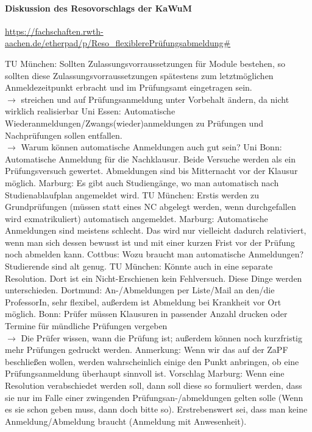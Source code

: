     \paragraph{Diskussion des Resovorschlags der KaWuM}
      \url{https://fachschaften.rwth-aachen.de/etherpad/p/Reso_flexiblerePrüfungsabmeldung#}
      \begin{outline}
        \1 TU München: \flqq Sollten Zulassungsvorraussetzungen für Module bestehen, so sollten diese Zulassungsvorraussetzungen spätestens zum letztmöglichen Anmeldezeitpunkt erbracht und im Prüfungsamt eingetragen sein.\frqq \\
          $\rightarrow$ streichen und auf Prüfungsanmeldung unter Vorbehalt ändern, da nicht wirklich realisierbar
        \1 Uni Essen: \flqq Automatische Wiederanmeldungen/Zwangs(wieder)anmeldungen zu Prüfungen und Nachprüfungen sollen entfallen.\frqq \\
          $\rightarrow$ Warum können automatische Anmeldungen auch gut sein?
          \2 Uni Bonn: Automatische Anmeldung für die Nachklausur. Beide Versuche werden als ein Prüfungsversuch gewertet. Abmeldungen sind bis Mitternacht vor der Klausur möglich.
          \2 Marburg: Es gibt auch Studiengänge, wo man automatisch nach Studienablaufplan angemeldet wird.
          \2 TU München: Erstis werden zu Grundprüfungen (müssen statt eines NC abgelegt werden, wenn durchgefallen wird exmatrikuliert) automatisch angemeldet.
          \2 Marburg: Automatische Anmeldungen sind meistens schlecht. Das wird nur vielleicht dadurch relativiert, wenn man sich dessen bewusst ist und mit einer kurzen Frist vor der Prüfung noch abmelden kann.
          \2 Cottbus: Wozu braucht man automatische Anmeldungen? Studierende sind alt genug.
          \2 TU München: Könnte auch in eine separate Resolution. Dort ist ein Nicht-Erschienen kein Fehlversuch. Diese Dinge werden unterschieden.
          \2 Dortmund: An-/Abmeldungen per Liste/Mail an den/die ProfessorIn, sehr flexibel, außerdem ist Abmeldung bei Krankheit vor Ort möglich.
        \1 Bonn: \flqq Prüfer müssen Klausuren in passender Anzahl drucken oder Termine für mündliche Prüfungen vergeben\frqq \\
          $\rightarrow$ Die Prüfer wissen, wann die Prüfung ist; außerdem können noch kurzfristig mehr Prüfungen gedruckt werden.
        \1 Anmerkung: Wenn wir das auf der ZaPF beschließen wollen, werden wahrscheinlich einige den Punkt anbringen, ob eine Prüfungsanmeldung überhaupt sinnvoll ist.
        \1 Vorschlag Marburg: Wenn eine Resolution verabschiedet werden soll, dann soll diese so formuliert werden, dass sie nur im Falle einer zwingenden Prüfungsan-/abmeldungen gelten solle (\flqq Wenn es sie schon geben muss, dann doch bitte so\frqq). Erstrebenswert sei, dass man keine Anmeldung/Abmeldung braucht (\flqq Anmeldung mit Anwesenheit\frqq).

\end{outline}
